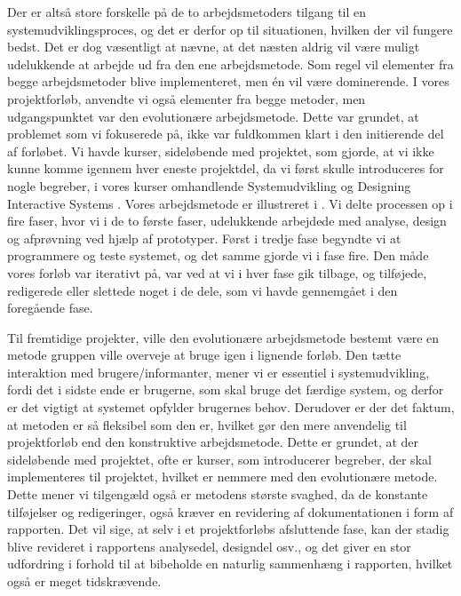 Der er altså store forskelle på de to arbejdsmetoders tilgang til en systemudviklingsproces, og det er derfor op til situationen, hvilken der vil fungere bedst. Det er dog væsentligt at nævne, at det næsten aldrig vil være muligt udelukkende at arbejde ud fra den ene arbejdsmetode. Som regel vil elementer fra begge arbejdsmetoder blive implementeret, men én vil være dominerende. I vores projektforløb, anvendte vi også elementer fra begge metoder, men udgangspunktet var den evolutionære arbejdsmetode. Dette var grundet, at problemet som vi fokuserede på, ikke var fuldkommen klart i den initierende del af forløbet. Vi havde kurser, sideløbende med projektet, som gjorde, at vi ikke kunne komme igennem hver eneste projektdel, da vi først skulle introduceres for nogle begreber, i vores kurser omhandlende Systemudvikling \cite{ooad} og Designing Interactive Systems \cite{deb}. Vores arbejdsmetode er illustreret i . Vi delte processen op i fire faser, hvor vi i de to første faser, udelukkende arbejdede med analyse, design og afprøvning ved hjælp af prototyper. Først i tredje fase begyndte vi at programmere og teste systemet, og det samme gjorde vi i fase fire. Den måde vores forløb var iterativt på, var ved at vi i hver fase gik tilbage, og tilføjede, redigerede eller slettede noget i de dele, som vi havde gennemgået i den foregående fase.

Til fremtidige projekter, ville den evolutionære arbejdsmetode bestemt være en metode gruppen ville overveje at bruge igen i lignende forløb. Den tætte interaktion med brugere/informanter, mener vi er essentiel i systemudvikling, fordi det i sidste ende er brugerne, som skal bruge det færdige system, og derfor er det vigtigt at systemet opfylder brugernes behov. Derudover er der det faktum, at metoden er så fleksibel som den er, hvilket gør den mere anvendelig til projektforløb end den konstruktive arbejdsmetode. Dette er grundet, at der sideløbende med projektet, ofte er kurser, som introducerer begreber, der skal implementeres til projektet, hvilket er nemmere med den evolutionære metode. Dette mener vi tilgengæld også er metodens største svaghed, da de konstante tilføjelser og redigeringer, også kræver en revidering af dokumentationen i form af rapporten. Det vil sige, at selv i et projektforløbs afsluttende fase, kan der stadig blive revideret i rapportens analysedel, designdel osv., og det giver en stor udfordring i forhold til at bibeholde en naturlig sammenhæng i rapporten, hvilket også er meget tidskrævende.

